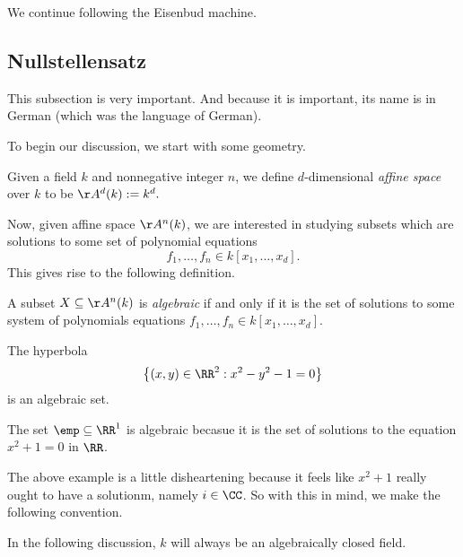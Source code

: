 
We continue following the Eisenbud machine.

\subsection{Nullstellensatz}
This subsection is very important. And because it is important, its name is in German (which was the language of German).

To begin our discussion, we start with some geometry.
\begin{definition}
	Given a field $k$ and nonnegative integer $n$, we define $d$-dimensional \textit{affine space} over $k$ to be $\AA^d(k):=k^d.$
\end{definition}
Now, given affine space $\AA^n(k)$, we are interested in studying subsets which are solutions to some set of polynomial equations
\[f_1,\ldots,f_n\in k[x_1,\ldots,x_d].\]
This gives rise to the following definition.
\begin{definition}[Algebraic]
	A subset $X\subseteq\AA^n(k)$ is \textit{algebraic} if and only if it is the set of solutions to some system of polynomials equations $f_1,\ldots,f_n\in k[x_1,\ldots,x_d]$.
\end{definition}
\begin{example}
	The hyperbola
	\[\left\{(x,y)\in\RR^2:x^2-y^2-1=0\right\}\]
	is an algebraic set.
\end{example}
\begin{example}
	The set $\emp\subseteq\RR^1$ is algebraic becasue it is the set of solutions to the equation $x^2+1=0$ in $\RR$.
\end{example}
The above example is a little disheartening because it feels like $x^2+1$ really ought to have a solutionm, namely $i\in\CC$. So with this in mind, we make the following convention.
\begin{warn}
	In the following discussion, $k$ will always be an algebraically closed field.
\end{warn}

